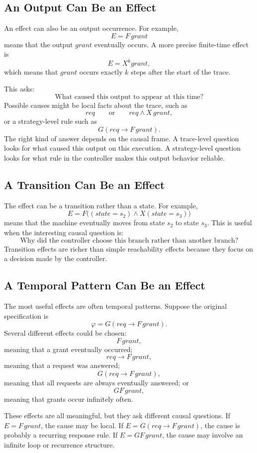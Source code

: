 \documentclass[11pt]{article}
\theoremstyle{remark}
\begin{document}
\subsection{An Output Can Be an Effect}

An effect can also be an output occurrence. For example,
\[
  E = F\,grant
\]
means that the output \(grant\) eventually occurs. A more precise finite-time
effect is
\[
  E = X^k grant,
\]
which means that \(grant\) occurs exactly \(k\) steps after the start of the
trace.

This asks:
\[
  \text{What caused this output to appear at this time?}
\]
Possible causes might be local facts about the trace, such as
\[
  req
  \qquad\text{or}\qquad
  req \land X\,grant,
\]
or a strategy-level rule such as
\[
  G(req\rightarrow F\,grant).
\]
The right kind of answer depends on the causal frame. A trace-level question
looks for what caused this output on this execution. A strategy-level question
looks for what rule in the controller makes this output behavior reliable.

\subsection{A Transition Can Be an Effect}

The effect can be a transition rather than a state. For example,
\[
  E = F\bigl((state=s_2)\land X(state=s_3)\bigr)
\]
means that the machine eventually moves from state \(s_2\) to state \(s_3\).
This is useful when the interesting causal question is:
\[
  \text{Why did the controller choose this branch rather than another branch?}
\]
Transition effects are richer than simple reachability effects because they
focus on a decision made by the controller.

\subsection{A Temporal Pattern Can Be an Effect}

The most useful effects are often temporal patterns. Suppose the original
specification is
\[
  \varphi = G(req\rightarrow F\,grant).
\]
Several different effects could be chosen:
\[
  F\,grant,
\]
meaning that a grant eventually occurred;
\[
  req\rightarrow F\,grant,
\]
meaning that a request was answered;
\[
  G(req\rightarrow F\,grant),
\]
meaning that all requests are always eventually answered; or
\[
  GF\,grant,
\]
meaning that grants occur infinitely often.

These effects are all meaningful, but they ask different causal questions. If
\(E=F\,grant\), the cause may be local. If
\(E=G(req\rightarrow F\,grant)\), the cause is probably a recurring response
rule. If \(E=GF\,grant\), the cause may involve an infinite loop or recurrence
structure.
\end{document}
